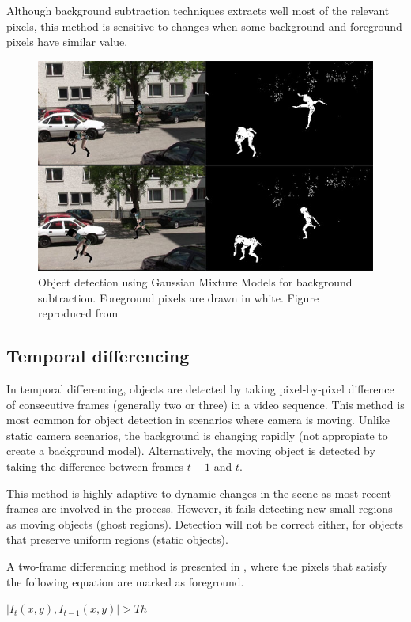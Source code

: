 Although background subtraction techniques extracts well most of the relevant
pixels, this method is sensitive to changes when some background and foreground
pixels have similar value.

\begin{figure}[h!]
	\centering
		\includegraphics[width=0.7\linewidth]{Figures/bg_sub.jpg}
	\caption[Object detection using Gaussian Mixture Models for background
	subtraction]
	{Object detection using Gaussian Mixture Models for background
	subtraction. Foreground pixels are drawn in white. Figure reproduced from
	\cite{Pham2010}}
	\label{fig::bg_sub}
\end{figure}

\subsection{Temporal differencing}

In temporal differencing, objects are detected by taking pixel-by-pixel
difference of consecutive frames (generally two or three) in a video sequence.
This method is most common for object detection in scenarios where camera
is moving. Unlike static camera scenarios, the background is changing rapidly
(not appropiate to create a background model). Alternatively,
the moving object is detected by taking the difference between frames $t - 1$
and $t$.

This method is highly adaptive to dynamic changes in the scene as most recent
frames are involved in the process. However, it fails detecting new small
regions as moving objects (ghost regions). Detection will not be correct either,
for objects that preserve uniform regions (static objects).

A two-frame differencing method is presented in \cite{Lipton1998a}, where the
pixels that satisfy the following equation are marked as foreground.\\
\centerline{$|I_t(x,y), I_{t-1}(x,y)|>Th$}

